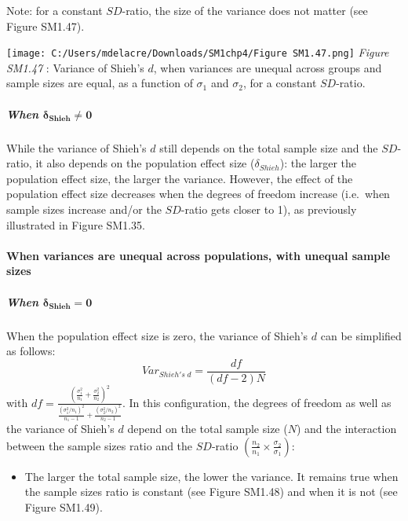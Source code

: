 \documentclass[
  english,
  man,mask,floatsintext]{apa6}
\providecommand{\tightlist}{%
  \setlength{\itemsep}{0pt}\setlength{\parskip}{0pt}}
\let\oldparagraph\paragraph
\renewcommand{\paragraph}[1]{\oldparagraph{#1}\mbox{}}
\let\oldsubparagraph\subparagraph
\renewcommand{\subparagraph}[1]{\oldsubparagraph{#1}\mbox{}}
\begin{document}
Note: for a constant \(SD\)-ratio, the size of the variance does not matter (see Figure SM1.47).

\texttt{[image: C:/Users/mdelacre/Downloads/SM1chp4/Figure SM1.47.png]}
\emph{Figure SM1.47} : Variance of Shieh's \(d\), when variances are unequal across groups and sample sizes are equal, as a function of \(\sigma_1\) and \(\sigma_2\), for a constant \(SD\)-ratio.

\hypertarget{when-bmdelta_shieh-neq-0-1}{%
\subparagraph{\texorpdfstring{When \(\bm{\delta_{Shieh} \neq 0}\)}{When \textbackslash bm\{\textbackslash delta\_\{Shieh\} \textbackslash neq 0\}}}\label{when-bmdelta_shieh-neq-0-1}}

While the variance of Shieh's \(d\) still depends on the total sample size and the \(SD\)-ratio, it also depends on the population effect size (\(\delta_{Shieh}\)): the larger the population effect size, the larger the variance. However, the effect of the population effect size decreases when the degrees of freedom increase (i.e.~when sample sizes increase and/or the \(SD\)-ratio gets closer to 1), as previously illustrated in Figure SM1.35.

\hypertarget{when-variances-are-unequal-across-populations-with-unequal-sample-sizes-4}{%
\paragraph{When variances are unequal across populations, with unequal sample sizes}\label{when-variances-are-unequal-across-populations-with-unequal-sample-sizes-4}}

\hypertarget{when-bmdelta_shieh-0-2}{%
\subparagraph{\texorpdfstring{When \(\bm{\delta_{Shieh} = 0}\)}{When \textbackslash bm\{\textbackslash delta\_\{Shieh\} = 0\}}}\label{when-bmdelta_shieh-0-2}}

When the population effect size is zero, the variance of Shieh's \(d\) can be simplified as follows:
\[Var_{Shieh's \; d} = \frac{df}{(df-2)N}\]
with \(df = \frac{\left(\frac{\sigma^2_1}{n_1}+\frac{\sigma^2_2}{n_2} \right)^2}{\frac{(\sigma^2_1/n_1)^2}{n_1-1}+\frac{(\sigma^2_2/n_2)^2}{n_2-1}}\). In this configuration, the degrees of freedom as well as the variance of Shieh's \(d\) depend on the total sample size (\(N\)) and the interaction between the sample sizes ratio and the \(SD\)-ratio \(\left(\frac{n_2}{n_1}\times\frac{\sigma_2}{\sigma_1} \right)\):

\begin{itemize}
\tightlist
\item
  The larger the total sample size, the lower the variance. It remains true when the sample sizes ratio is constant (see Figure SM1.48) and when it is not (see Figure SM1.49).
\end{itemize}
\end{document}
